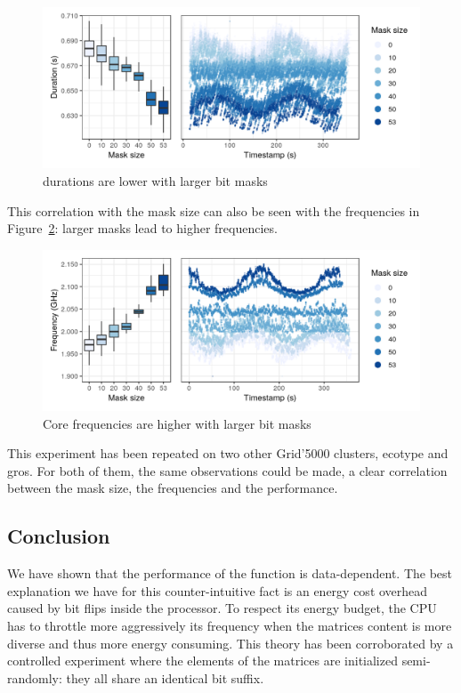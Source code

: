             \begin{figure}[htbp]
                \centering
                \includegraphics[width=\linewidth]{img/experiment/bit-flips/mask_size_perf.png}
                \caption{\label{fig:exp:bit-flips:mask-perf}
                \dgemm durations are lower with larger bit masks}
            \end{figure}

            This correlation with the mask size can also be seen with the frequencies in
            Figure~\ref{fig:exp:bit-flips:mask-freq}: larger masks lead to higher frequencies.

            \begin{figure}[htbp]
                \centering
                \includegraphics[width=\linewidth]{img/experiment/bit-flips/mask_size_freq.png}
                \caption{\label{fig:exp:bit-flips:mask-freq}
                Core frequencies are higher with larger bit masks}
            \end{figure}

            This experiment has been repeated on two other Grid'5000 clusters, ecotype and gros. For both of them, the
            same observations could be made, a clear correlation between the mask size, the frequencies and the
            performance.

        \subsection{Conclusion}
            We have shown that the performance of the \dgemm function is data-dependent. The best explanation we
            have for this counter-intuitive fact is an energy cost overhead caused by bit flips inside the processor.
            To respect its energy budget, the CPU has to throttle more aggressively its frequency when the matrices
            content is more diverse and thus more energy consuming.
            This theory has been corroborated by a controlled experiment where the elements of the matrices are
            initialized semi-randomly: they all share an identical bit suffix.

